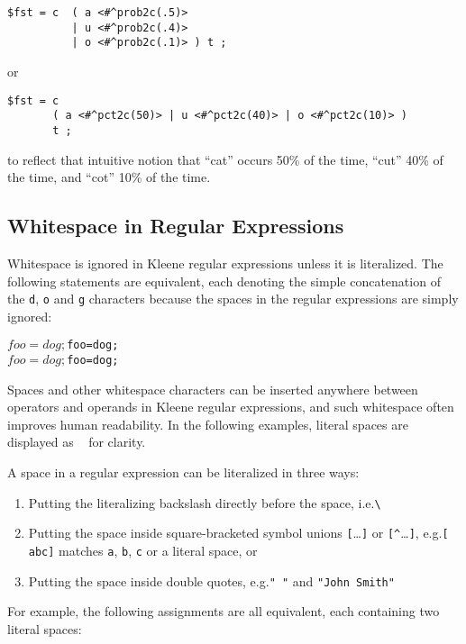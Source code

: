 \begin{Verbatim}
$fst = c  ( a <#^prob2c(.5)> 
          | u <#^prob2c(.4)> 
          | o <#^prob2c(.1)> ) t ;
\end{Verbatim}

\noindent
or

\begin{Verbatim}
$fst = c  
       ( a <#^pct2c(50)> | u <#^pct2c(40)> | o <#^pct2c(10)> ) 
       t ;
\end{Verbatim}

\noindent
to reflect that intuitive notion that ``cat'' occurs 50\% of the time, ``cut'' 40\% of the time, and ``cot''
10\% of the time.


\subsection{Whitespace in Regular Expressions}
 
Whitespace is ignored in Kleene regular expressions unless it is
literalized.  The following statements are equivalent, each denoting the
simple concatenation of the \texttt{d}, \texttt{o} and \texttt{g}
characters because the
spaces in the regular expressions are simply ignored:

\begin{alltt}
$foo = dog ;
$foo = do g ;
$foo = d og ;
$foo = d o g ;
\end{alltt}

\noindent
Spaces and other whitespace characters can be inserted anywhere between operators and operands in Kleene regular
expressions, and such whitespace often improves human readability.  In the following examples,
literal spaces are displayed as \verb*! ! for clarity. 

A space in a regular expression can be literalized in three ways:

\begin{enumerate}
\item
Putting the literalizing backslash directly before the space, i.e.\@ \verb*!\ !
\item
Putting the space inside square-bracketed symbol unions \verb![!\ldots\verb!]! or
\verb![^!\ldots\verb!]!, e.g.\@ \verb*![ abc]! matches \verb!a!,
\verb!b!, \verb!c! or a literal space, or
\item
Putting the space inside double quotes, e.g.\@ \verb*!" "! and
\verb*!"John Smith"!
\end{enumerate}

\noindent
For example, the following assignments are all equivalent, each containing two literal
spaces:

